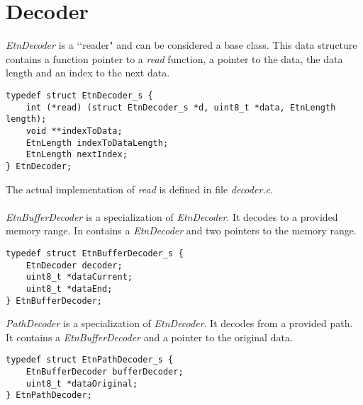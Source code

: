 

\section*{Decoder}
\emph{EtnDecoder} is a \lq\lq reader" and can be considered a base class. This data structure contains a function pointer to a \emph{read} function, a pointer to the data, the data length and an index to the next data.
\begin{lstlisting}
typedef struct EtnDecoder_s {
	int (*read) (struct EtnDecoder_s *d, uint8_t *data, EtnLength length);
	void **indexToData;
	EtnLength indexToDataLength;
	EtnLength nextIndex;
} EtnDecoder;
\end{lstlisting}
The actual implementation of \emph{read} is defined in file \emph{decoder.c}.\\\\
\emph{EtnBufferDecoder} is a specialization of \emph{EtnDecoder}. It decodes to a provided memory range. In contains a \emph{EtnDecoder} and two pointers to the memory range.
\begin{lstlisting}
typedef struct EtnBufferDecoder_s {
	EtnDecoder decoder;
	uint8_t *dataCurrent;
	uint8_t *dataEnd;
} EtnBufferDecoder;
\end{lstlisting}
\emph{PathDecoder} is a specialization of \emph{EtnDecoder}.
It decodes from a provided path. It contains a \emph{EtnBufferDecoder} and a pointer to the original data.
\begin{lstlisting}
typedef struct EtnPathDecoder_s {
	EtnBufferDecoder bufferDecoder;
	uint8_t *dataOriginal;
} EtnPathDecoder;
\end{lstlisting}











